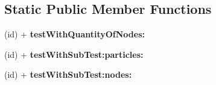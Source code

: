 \subsection*{Static Public Member Functions}
\begin{DoxyCompactItemize}
\item 
\hypertarget{interface_main_scene_acfd003405d1966d5ab5ce172ea2a93fa}{(id) + {\bfseries test\-With\-Quantity\-Of\-Nodes\-:}}\label{interface_main_scene_acfd003405d1966d5ab5ce172ea2a93fa}

\item 
\hypertarget{interface_main_scene_a21dfeea9e53b782cfd887e95bd6db8c8}{(id) + {\bfseries test\-With\-Sub\-Test\-:particles\-:}}\label{interface_main_scene_a21dfeea9e53b782cfd887e95bd6db8c8}

\item 
\hypertarget{interface_main_scene_a6239df2a4c05e233fa0abd852b1b183a}{(id) + {\bfseries test\-With\-Sub\-Test\-:nodes\-:}}\label{interface_main_scene_a6239df2a4c05e233fa0abd852b1b183a}

\end{DoxyCompactItemize}
